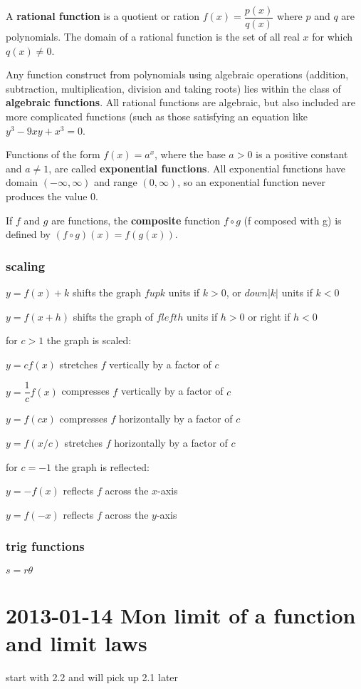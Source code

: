 \documentclass[12pt]{article}
\begin{document}
A \textbf{rational function} is a quotient or ration $f(x) = \dfrac{p(x)}{q(x)}$ where $p$ and $q$ are
polynomials. The domain of a rational function is the set of all real $x$ for which $q(x) \neq 0$.

Any function construct from polynomials using algebraic operations (addition, subtraction, multiplication,
division and taking roots) lies within the class of \textbf{algebraic functions}. All rational functions are
algebraic, but also included are more complicated functions (such as those satisfying an equation like $y^{3}
- 9xy + x^{3} = 0$.

Functions of the form $f(x) = a^{x}$, where the base $a > 0$ is a positive constant and $a \neq 1$, are called
\textbf{exponential functions}. All exponential functions have domain $(-\infty,\infty)$ and range
$(0,\infty)$, so an exponential function never produces the value 0.

If $f$ and $g$ are functions, the \textbf{composite} function $f \circ g$ (f composed with g) is defined by
$(f \circ g)(x) = f(g(x))$.

\subsubsection{scaling}
$y = f(x) + k$ shifts the graph $f up k$ units if $k > 0$, or $down |k|$ units if $k < 0$

$y = f(x + h)$ shifts the graph of $f left h$ units if $h > 0$ or right if $h < 0$

for $c > 1$ the graph is scaled:

$y = cf(x)$ stretches $f$ vertically by a factor of $c$

$y = \dfrac{1}{c}f(x)$ compresses $f$ vertically by a factor of $c$

$y = f(cx)$ compresses $f$ horizontally by a factor of $c$

$y = f(x/c)$ stretches $f$ horizontally by a factor of $c$

for $c = -1$ the graph is reflected:

$y = -f(x)$ reflects $f$ across the $x$-axis

$y = f(-x)$ reflects $f$ across the $y$-axis

\subsubsection{trig functions}

$s = r\theta$

\section{2013-01-14 Mon limit of a function and limit laws}
start with 2.2 and will pick up 2.1 later
\end{document}
